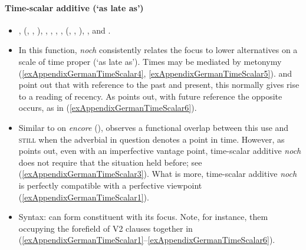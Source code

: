 \paragraph{Time-scalar additive (\lq as late as\rq)}\label{appendixGermanTimeScalar}
\begin{itemize}
	\item \Textcite{vanderAuwera1993}, \citeauthor{Beck2016} (\citeyear{Beck2016}, \citeyear{Beck2019}, \citeyear{Beck2020}), \textcite[s.v. \textit{noch}]{DWDS}, \textcite[s.v. \textit{noch}]{Duden}, \textcite{HoepelmanRohrer1981}, \textcite{Klein2018}, \citeauthor{Koenig1977} (\citeyear{Koenig1977}, \citeyear{Koenig1979}, \citeyear[ch. 7] {Koenig1991}),  \textcite[177]{KoenigEtAl1993}, \textcite[623–624]{MetrichFaucher2009} and \textcite{Shetter1966}.
	\item In this function, \textit{noch} consistently relates the focus to lower alternatives on a scale of time proper (\lq as late as\rq{}). Times may be mediated by metonymy (\ref{exAppendixGermanTimeScalar4}, \ref{exAppendixGermanTimeScalar5}). \textcite{Shetter1966} and \textcite{Koenig1979} point out that with reference to the past and present, this normally gives rise to a reading of recency. As \textcite{Koenig1979} points out, with future reference the opposite occurs, as in (\ref{exAppendixGermanTimeScalar6}).
	\item Similar to \textcite{MosegaardHansen2008} on  \textit{encore} (), \textcite{Shetter1966} observes a functional overlap between this use and \textsc{still} when the adverbial in question denotes a point in time. However, as \textcite{Beck2020} points out, even with an imperfective vantage point, time-scalar additive \textit{noch} does not require that the situation held before; see (\ref{exAppendixGermanTimeScalar3}). What is more, time-scalar additive \textit{noch} is perfectly compatible with a perfective viewpoint (\ref{exAppendixGermanTimeScalar1}).
	\item Syntax: can form constituent with its focus. Note, for instance, them occupying the forefield of V2 clauses together in (\ref{exAppendixGermanTimeScalar1}–\ref{exAppendixGermanTimeScalar6}).
\end{itemize}
\largerpage[-1]\pagebreak

